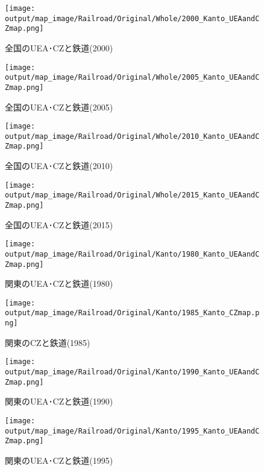 \documentclass{ltjsarticle}
\begin{document}
\begin{figure}[pbth]
  \centering
  \texttt{[image: output/map\_image/Railroad/Original/Whole/2000\_Kanto\_UEAandCZmap.png]}
  \caption{\label{2000:allCZandUEA:Rail}全国のUEA･CZと鉄道(2000)}
\end{figure}


\begin{figure}[pbth]
  \centering
  \texttt{[image: output/map\_image/Railroad/Original/Whole/2005\_Kanto\_UEAandCZmap.png]}
  \caption{\label{2005:allCZandUEA:Rail}全国のUEA･CZと鉄道(2005)}
\end{figure}


\begin{figure}[pbth]
  \centering
  \texttt{[image: output/map\_image/Railroad/Original/Whole/2010\_Kanto\_UEAandCZmap.png]}
  \caption{\label{2010:allCZandUEA:Rail}全国のUEA･CZと鉄道(2010)}
\end{figure}


\begin{figure}[pbth]
  \centering
  \texttt{[image: output/map\_image/Railroad/Original/Whole/2015\_Kanto\_UEAandCZmap.png]}
  \caption{\label{2015:allCZandUEA:Rail}全国のUEA･CZと鉄道(2015)}
\end{figure}

\begin{figure}[pbth]
  \centering
  \texttt{[image: output/map\_image/Railroad/Original/Kanto/1980\_Kanto\_UEAandCZmap.png]}
  \caption{\label{1980:KanCZandUEA:Rail}関東のUEA･CZと鉄道(1980)}
\end{figure}


\begin{figure}[pbth]
  \centering
  \texttt{[image: output/map\_image/Railroad/Original/Kanto/1985\_Kanto\_CZmap.png]}
  \caption{\label{1985:KanCZandUEA:Rail}関東のCZと鉄道(1985)}
\end{figure}


\begin{figure}[pbth]
  \centering
  \texttt{[image: output/map\_image/Railroad/Original/Kanto/1990\_Kanto\_UEAandCZmap.png]}
  \caption{\label{1990:KanCZandUEA:Rail}関東のUEA･CZと鉄道(1990)}
\end{figure}


\begin{figure}[pbth]
  \centering
  \texttt{[image: output/map\_image/Railroad/Original/Kanto/1995\_Kanto\_UEAandCZmap.png]}
  \caption{\label{1995:KanCZandUEA:Rail}関東のUEA･CZと鉄道(1995)}
\end{figure}
\end{document}
